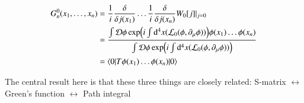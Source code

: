 \begin{align}
   G_n^0 (x_1,\dots, x_n) &= \frac{1}{i} \frac{\delta}{ \delta j(x_1)} \dots \frac{1}{i} \frac{\delta}{ \delta j(x_n)} W_0[j] |_{j=0} \notag \\
                          &= \frac{\int \mathcal{D} \phi \exp(i\int \dd^4 x (\mathcal{L}_0(\phi, \partial_\mu \phi)) )\phi(x_1) \dots \phi(x_n) }{\int \mathcal{D} \phi \exp(i\int \dd^4 x (\mathcal{L}_0(\phi, \partial_\mu \phi)))} \notag \\
                          &= \braket{0 | T \phi(x_1) \dots \phi(x_n) | 0}
\end{align}

The central result here is that these three things are closely related: S-matrix $\leftrightarrow$ Green's function $\leftrightarrow$ Path integral
